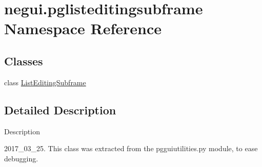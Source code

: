 \hypertarget{namespacenegui_1_1pglisteditingsubframe}{}\section{negui.\+pglisteditingsubframe Namespace Reference}
\label{namespacenegui_1_1pglisteditingsubframe}
\subsection*{Classes}
\begin{DoxyCompactItemize}
\item 
class \hyperlink{classnegui_1_1pglisteditingsubframe_1_1ListEditingSubframe}{List\+Editing\+Subframe}
\end{DoxyCompactItemize}


\subsection{Detailed Description}
\begin{DoxyVerb}Description

2017_03_25.  This class was extracted from 
the pgguiutilities.py module, to ease debugging.
\end{DoxyVerb}
 